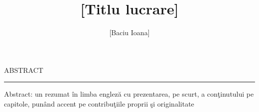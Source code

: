 \documentclass[12pt]{report}
\begin{document}
\title{[Titlu lucrare]}					   
\author{[Baciu Ioana]}											
				
\maketitle


\newpage
\thispagestyle{empty}
\mbox{}
\newpage
{} 

\cleardoublepage
ABSTRACT
\vspace{0.5cm}	
\hrule
\vspace{0.5cm}	

Abstract: un rezumat \^{i}n limba englez\u{a} cu prezentarea, pe scurt, a con\c{t}inutului pe capitole, pun\^{a}nd accent pe contribu\c{t}iile proprii \c{s}i originalitate



\tableofcontents


\newpage
{}














\end{document}
